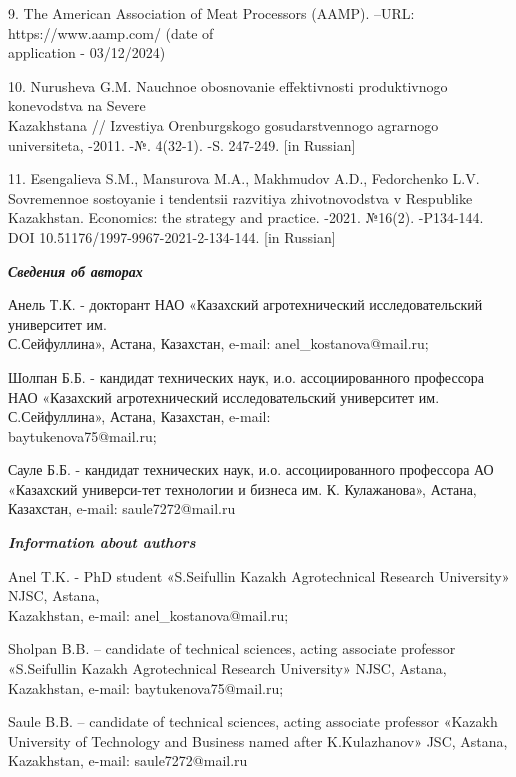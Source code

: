 \begin{noparindent}
9. The American Association of Meat Processors (AAMP). --URL:
https://www.aamp.com/ (date of \\application - 03/12/2024)

10. Nurusheva G.M. Nauchnoe obosnovanie effektivnosti produktivnogo
konevodstva na Severe \\Kazakhstana // Izvestiya Orenburgskogo
gosudarstvennogo agrarnogo universiteta, -2011. -№. 4(32-1). -S.
247-249. {[}in Russian{]}

11. Esengalieva S.M., Mansurova M.A., Makhmudov A.D., Fedorchenko L.V.
Sovremennoe sostoyanie i tendentsii razvitiya zhivotnovodstva v
Respublike Kazakhstan. Economics: the strategy and practice. -2021.
№16(2). -P134-144. DOI 10.51176/1997-9967-2021-2-134-144. {[}in
Russian{]}

\end{noparindent}

\emph{{\bfseries Сведения об авторах}}

\begin{noparindent}

Анель Т.К. - докторант НАО «Казахский агротехнический исследовательский
университет им. \\С.Сейфуллина», Астана, Казахстан, e-mail:
anel\_kostanova@mail.ru;

Шолпан Б.Б. - кандидат технических наук, и.о. ассоциированного
профессора НАО «Казахский агротехнический исследовательский университет
им. С.Сейфуллина», Астана, Казахстан, e-mail: \\baytukenova75@mail.ru;

Сауле Б.Б. - кандидат технических наук, и.о. ассоциированного профессора
АО «Казахский универси-тет технологии и бизнеса им. К. Кулажанова»,
Астана, Казахстан, e-mail: saule7272@mail.ru

\end{noparindent}

\emph{{\bfseries Information about authors}}

\begin{noparindent}

Anel T.K. - PhD student «S.Seifullin Kazakh Agrotechnical Research
University» NJSC, Astana, \\Kazakhstan, e-mail: anel\_kostanova@mail.ru;

Sholpan B.B. -- candidate of technical sciences, acting associate
professor «S.Seifullin Kazakh Agrotechnical Research University» NJSC,
Astana, Kazakhstan, e-mail: baytukenova75@mail.ru;

Saule B.B. -- candidate of technical sciences, acting associate
professor «Kazakh University of Technology and Business named after
K.Kulazhanov» JSC, Astana, Kazakhstan, e-mail: saule7272@mail.ru
\end{noparindent}